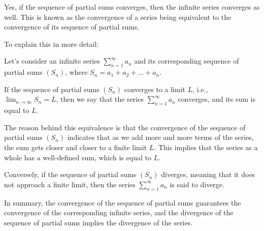 \documentclass[13pt]{letter}
\begin{document}
Yes, if the sequence of partial sums converges, then the infinite series converges as well. This is known as the convergence of a series being equivalent to the convergence of its sequence of partial sums.

To explain this in more detail:

Let's consider an infinite series $\sum_{n=1}^{\infty} a_n$ and its corresponding sequence of partial sums $(S_n)$, where $S_n = a_1 + a_2 + \ldots + a_n$.

If the sequence of partial sums $(S_n)$ converges to a limit $L$, i.e., $\lim_{n \to \infty} S_n = L$, then we say that the series $\sum_{n=1}^{\infty} a_n$ converges, and its sum is equal to $L$.

The reason behind this equivalence is that the convergence of the sequence of partial sums $(S_n)$ indicates that as we add more and more terms of the series, the sum gets closer and closer to a finite limit $L$. This implies that the series as a whole has a well-defined sum, which is equal to $L$.

Conversely, if the sequence of partial sums $(S_n)$ diverges, meaning that it does not approach a finite limit, then the series $\sum_{n=1}^{\infty} a_n$ is said to diverge.

In summary, the convergence of the sequence of partial sums guarantees the convergence of the corresponding infinite series, and the divergence of the sequence of partial sums implies the divergence of the series.
\end{document}
